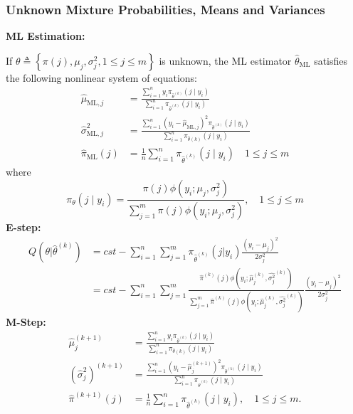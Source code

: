 \documentclass[11pt,a4paper]{article}
\begin{document}
\subsubsection{Unknown Mixture Probabilities, Means and Variances}
\textbf{ML Estimation:}

If $\theta \triangleq\left\{\pi(j), \mu_j, \sigma_j^2, 1 \leq j \leq m\right\}$ is unknown, the ML estimator $\hat{\theta}_{\mathrm{ML}}$ satisfies the following nonlinear system of equations:
$$
\begin{aligned}
\hat{\mu}_{\mathrm{ML}, j} &=\frac{\sum_{i=1}^n y_i \pi_{\hat{\theta}^{(k)}}\left(j \mid y_i\right)}{\sum_{i=1}^n \pi_{\hat{\theta}^{(k)}}\left(j \mid y_i\right)} \\
\hat{\sigma}_{\mathrm{ML}, j}^2 &=\frac{\sum_{i=1}^n\left(y_i-\hat{\mu}_{\mathrm{ML}, j}\right)^2 \pi_{\hat{\theta}^{(k)}}\left(j \mid y_i\right)}{\sum_{i=1}^n \pi_{\hat{\theta}(k)}\left(j \mid y_i\right)} \\
\hat{\pi}_{\mathrm{ML}}(j) &=\frac{1}{n} \sum_{i=1}^n \pi_{\hat{\theta}^{(k)}}\left(j \mid y_i\right) \quad 1 \leq j \leq m
\end{aligned}
$$
where
$$
\pi_\theta\left(j \mid y_i\right)=\frac{\pi(j) \phi\left(y_i ; \mu_j, \sigma_j^2\right)}{\sum_{j=1}^m \pi(j) \phi\left(y_i ; \mu_j, \sigma_j^2\right)}, \quad 1 \leq j \leq m
$$
\textbf{E-step:}
\begin{equation}
    \begin{aligned}
        Q(\theta|\hat{\theta}^{(k)})
        &=cst-\sum_{i=1}^n\sum_{j=1}^m\pi_{\hat{\theta}^{(k)}}(j|y_i)\frac{(y_i-\mu_j)^2}{2\sigma_j^2}\\
        &=cst-\sum_{i=1}^n\sum_{j=1}^m\frac{\hat{\pi}^{(k)}(j)\phi(y_i ; \hat{\mu}_j^{(k)}, \hat{\sigma_j^2}^{(k)})}{\sum_{j=1}^m\hat{\pi}^{(k)}(j)\phi(y_i ; \hat{\mu}_j^{(k)}, \hat{\sigma_j^2}^{(k)})}\frac{(y_i-\mu_j)^2}{2\sigma_j^2}
    \end{aligned}
    \nonumber
\end{equation}
\textbf{M-Step:}
\begin{equation}
    \begin{aligned}
        \hat{\mu}_j^{(k+1)} &=\frac{\sum_{i=1}^n y_i \pi_{\hat{\theta}^{(k)}}\left(j \mid y_i\right)}{\sum_{i=1}^n \pi_{\hat{\theta}(k)}\left(j \mid y_i\right)} \\
        \left(\hat{\sigma}_j^2\right)^{(k+1)} &=\frac{\sum_{i=1}^n\left(y_i-\hat{\mu}_j^{(k+1)}\right)^2 \pi_{\hat{\theta}^{(k)}}\left(j \mid y_i\right)}{\sum_{i=1}^n \pi_{\hat{\theta}^{(k)}}\left(j \mid y_i\right)} \\
        \hat{\pi}^{(k+1)}(j) &=\frac{1}{n} \sum_{i=1}^n \pi_{\hat{\theta}^{(k)}}\left(j \mid y_i\right), \quad 1 \leq j \leq m .
    \end{aligned}
    \nonumber
\end{equation}
\end{document}

